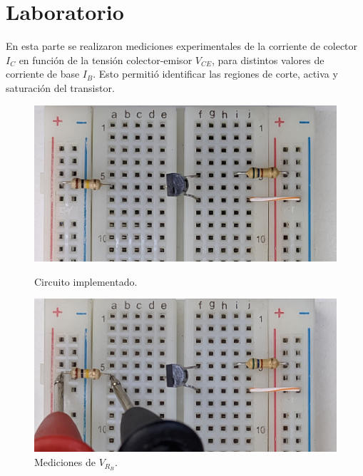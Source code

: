   \section{Laboratorio}
    En esta parte se realizaron mediciones experimentales de la corriente de colector $I_C$ en función de la tensión
    colector-emisor $V_{CE}$, para distintos valores de corriente de base $I_B$. Esto permitió identificar las regiones
    de corte, activa y saturación del transistor.

    \begin{figure}[!ht]
      \centering
      \begin{minipage}{0.49\textwidth}
        \includegraphics[width=1\textwidth]{pictures/prot_crkt-2_3.jpg}
        \caption{Circuito implementado.}
      \end{minipage}
      \begin{minipage}{0.49\textwidth}
        \includegraphics[width=1\textwidth]{pictures/prot_crkt-2_3_Vrb.jpg}
        \caption{Mediciones de $V_{R_B}$.}
      \end{minipage}
    \end{figure}
